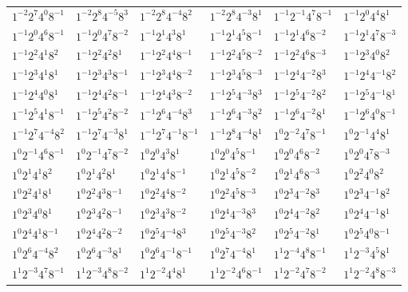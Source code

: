 \documentclass[12pt]{amsart}
\numberwithin{equation}{section}
\theoremstyle{plain}
\theoremstyle{definition}
\theoremstyle{remark}
\begin{document}
\begin{longtable}{llllll}
$1^{-2}2^{7}4^{0}8^{-1}$ & $1^{-2}2^{8}4^{-5}8^{3}$ & $1^{-2}2^{8}4^{-4}8^{2}$ & $1^{-2}2^{8}4^{-3}8^{1}$ & $1^{-1}2^{-1}4^{7}8^{-1}$ & $1^{-1}2^{0}4^{4}8^{1}$\\
$1^{-1}2^{0}4^{6}8^{-1}$ & $1^{-1}2^{0}4^{7}8^{-2}$ & $1^{-1}2^{1}4^{3}8^{1}$ & $1^{-1}2^{1}4^{5}8^{-1}$ & $1^{-1}2^{1}4^{6}8^{-2}$ & $1^{-1}2^{1}4^{7}8^{-3}$\\
$1^{-1}2^{2}4^{1}8^{2}$ & $1^{-1}2^{2}4^{2}8^{1}$ & $1^{-1}2^{2}4^{4}8^{-1}$ & $1^{-1}2^{2}4^{5}8^{-2}$ & $1^{-1}2^{2}4^{6}8^{-3}$ & $1^{-1}2^{3}4^{0}8^{2}$\\
$1^{-1}2^{3}4^{1}8^{1}$ & $1^{-1}2^{3}4^{3}8^{-1}$ & $1^{-1}2^{3}4^{4}8^{-2}$ & $1^{-1}2^{3}4^{5}8^{-3}$ & $1^{-1}2^{4}4^{-2}8^{3}$ & $1^{-1}2^{4}4^{-1}8^{2}$\\
$1^{-1}2^{4}4^{0}8^{1}$ & $1^{-1}2^{4}4^{2}8^{-1}$ & $1^{-1}2^{4}4^{3}8^{-2}$ & $1^{-1}2^{5}4^{-3}8^{3}$ & $1^{-1}2^{5}4^{-2}8^{2}$ & $1^{-1}2^{5}4^{-1}8^{1}$\\
$1^{-1}2^{5}4^{1}8^{-1}$ & $1^{-1}2^{5}4^{2}8^{-2}$ & $1^{-1}2^{6}4^{-4}8^{3}$ & $1^{-1}2^{6}4^{-3}8^{2}$ & $1^{-1}2^{6}4^{-2}8^{1}$ & $1^{-1}2^{6}4^{0}8^{-1}$\\
$1^{-1}2^{7}4^{-4}8^{2}$ & $1^{-1}2^{7}4^{-3}8^{1}$ & $1^{-1}2^{7}4^{-1}8^{-1}$ & $1^{-1}2^{8}4^{-4}8^{1}$ & $1^{0}2^{-2}4^{7}8^{-1}$ & $1^{0}2^{-1}4^{4}8^{1}$\\
$1^{0}2^{-1}4^{6}8^{-1}$ & $1^{0}2^{-1}4^{7}8^{-2}$ & $1^{0}2^{0}4^{3}8^{1}$ & $1^{0}2^{0}4^{5}8^{-1}$ & $1^{0}2^{0}4^{6}8^{-2}$ & $1^{0}2^{0}4^{7}8^{-3}$\\
$1^{0}2^{1}4^{1}8^{2}$ & $1^{0}2^{1}4^{2}8^{1}$ & $1^{0}2^{1}4^{4}8^{-1}$ & $1^{0}2^{1}4^{5}8^{-2}$ & $1^{0}2^{1}4^{6}8^{-3}$ & $1^{0}2^{2}4^{0}8^{2}$\\
$1^{0}2^{2}4^{1}8^{1}$ & $1^{0}2^{2}4^{3}8^{-1}$ & $1^{0}2^{2}4^{4}8^{-2}$ & $1^{0}2^{2}4^{5}8^{-3}$ & $1^{0}2^{3}4^{-2}8^{3}$ & $1^{0}2^{3}4^{-1}8^{2}$\\
$1^{0}2^{3}4^{0}8^{1}$ & $1^{0}2^{3}4^{2}8^{-1}$ & $1^{0}2^{3}4^{3}8^{-2}$ & $1^{0}2^{4}4^{-3}8^{3}$ & $1^{0}2^{4}4^{-2}8^{2}$ & $1^{0}2^{4}4^{-1}8^{1}$\\
$1^{0}2^{4}4^{1}8^{-1}$ & $1^{0}2^{4}4^{2}8^{-2}$ & $1^{0}2^{5}4^{-4}8^{3}$ & $1^{0}2^{5}4^{-3}8^{2}$ & $1^{0}2^{5}4^{-2}8^{1}$ & $1^{0}2^{5}4^{0}8^{-1}$\\
$1^{0}2^{6}4^{-4}8^{2}$ & $1^{0}2^{6}4^{-3}8^{1}$ & $1^{0}2^{6}4^{-1}8^{-1}$ & $1^{0}2^{7}4^{-4}8^{1}$ & $1^{1}2^{-4}4^{8}8^{-1}$ & $1^{1}2^{-3}4^{5}8^{1}$\\
$1^{1}2^{-3}4^{7}8^{-1}$ & $1^{1}2^{-3}4^{8}8^{-2}$ & $1^{1}2^{-2}4^{4}8^{1}$ & $1^{1}2^{-2}4^{6}8^{-1}$ & $1^{1}2^{-2}4^{7}8^{-2}$ & $1^{1}2^{-2}4^{8}8^{-3}$\\

\end{longtable}
\end{document}
